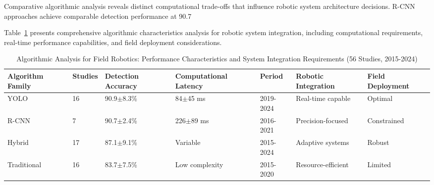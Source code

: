 \documentclass[a4paper,fleqn]{cas-dc}
\begin{document}
Comparative algorithmic analysis reveals distinct computational trade-offs that influence robotic system architecture decisions. R-CNN approaches achieve comparable detection performance at 90.7%

Table~\ref{tab:ras_algorithmic_analysis} presents comprehensive algorithmic characteristics analysis for robotic system integration, including computational requirements, real-time performance capabilities, and field deployment considerations.

\begin{table}[htbp]
\centering
\small
\caption{Algorithmic Analysis for Field Robotics: Performance Characteristics and System Integration Requirements (56 Studies, 2015-2024)}
\label{tab:ras_algorithmic_analysis}
\renewcommand{\arraystretch}{1.3}
\begin{tabular}{p{2.5cm}p{1.5cm}p{2.5cm}p{2.5cm}p{2cm}p{2.5cm}p{2cm}}
\toprule
\textbf{Algorithm Family} & \textbf{Studies} & \textbf{Detection Accuracy} & \textbf{Computational Latency} & \textbf{Period} & \textbf{Robotic Integration} & \textbf{Field Deployment} \\
\midrule
YOLO & 16 & 90.9$\pm$8.3\% & 84$\pm$45 ms & 2019-2024 & Real-time capable & Optimal \\
R-CNN & 7 & 90.7$\pm$2.4\% & 226$\pm$89 ms & 2016-2021 & Precision-focused & Constrained \\
Hybrid & 17 & 87.1$\pm$9.1\% & Variable & 2015-2024 & Adaptive systems & Robust \\
Traditional & 16 & 83.7$\pm$7.5\% & Low complexity & 2015-2020 & Resource-efficient & Limited \\
\bottomrule
\end{tabular}
\end{table}
\end{document}
